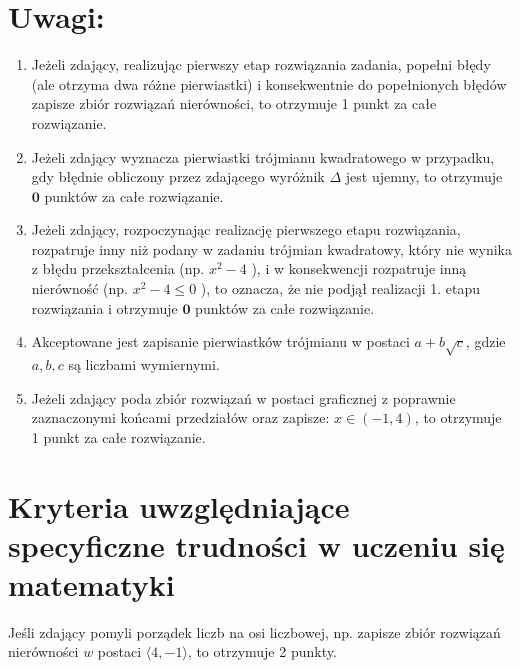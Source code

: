 \documentclass[10pt]{article}
\begin{document}
\section*{Uwagi:}
\begin{enumerate}
  \item Jeżeli zdający, realizując pierwszy etap rozwiązania zadania, popełni błędy (ale otrzyma dwa różne pierwiastki) i konsekwentnie do popełnionych błędów zapisze zbiór rozwiązań nierówności, to otrzymuje 1 punkt za całe rozwiązanie.
  \item Jeżeli zdający wyznacza pierwiastki trójmianu kwadratowego w przypadku, gdy błędnie obliczony przez zdającego wyróżnik $\Delta$ jest ujemny, to otrzymuje $\mathbf{0}$ punktów za całe rozwiązanie.
  \item Jeżeli zdający, rozpoczynając realizację pierwszego etapu rozwiązania, rozpatruje inny niż podany w zadaniu trójmian kwadratowy, który nie wynika z błędu przekształcenia (np. $x^{2}-4$ ), i w konsekwencji rozpatruje inną nierówność (np. $x^{2}-4 \leq 0$ ), to oznacza, że nie podjął realizacji 1. etapu rozwiązania i otrzymuje $\mathbf{0}$ punktów za całe rozwiązanie.
  \item Akceptowane jest zapisanie pierwiastków trójmianu w postaci $a+b \sqrt{c}$, gdzie $a, b, c$ są liczbami wymiernymi.
  \item Jeżeli zdający poda zbiór rozwiązań w postaci graficznej z poprawnie zaznaczonymi końcami przedziałów oraz zapisze: $x \in(-1,4)$, to otrzymuje 1 punkt za całe rozwiązanie.
\end{enumerate}

\section*{Kryteria uwzględniające specyficzne trudności w uczeniu się matematyki}
Jeśli zdający pomyli porządek liczb na osi liczbowej, np. zapisze zbiór rozwiązań nierówności $w$ postaci $\langle 4,-1\rangle$, to otrzymuje 2 punkty.
\end{document}
